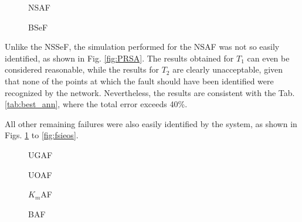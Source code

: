 \documentclass[10pt,fleqn,a4paper]{article}
\begin{document}
\begin{figure}[htb]
    \begin{minipage}[b]{0.48\linewidth}
        \scalebox{0.65}{}
        \vspace{0.5cm}
        \caption{NSAF}
        \label{fig:fasr}
    \end{minipage}
    \hfill
    \begin{minipage}[b]{0.48\linewidth}
        \scalebox{0.65}{}
        \vspace{0.5cm}
        \caption{BSeF}
        \label{fig:fseq}
    \end{minipage}
\end{figure}

Unlike the NSSeF, the simulation performed for the NSAF was not so easily
identified, as shown in Fig. \ref{fig:PRSA}. The results obtained for $T_1$ can
even be considered reasonable, while the results for $T_2$ are clearly
unacceptable, given that none of the points at which the fault should have been
identified were recognized by the network. Nevertheless, the results are
consistent with the Tab. \ref{tab:best_ann}, where the total error exceeds 40\%.

All other remaining failures were also easily identified by the system, as shown
in Figs. \ref{fig:fseq} to \ref{fig:fsieos}.

\begin{figure}[htb]
    \begin{minipage}[b]{0.48\linewidth}
        \scalebox{0.65}{}
        \vspace{0.5cm}
        \caption{UGAF}
        \label{fig:fadg}
    \end{minipage}
    \hfill
    \begin{minipage}[b]{0.48\linewidth}
        \scalebox{0.65}{}
        \vspace{0.5cm}
        \caption{UOAF}
        \label{fig:fado}
    \end{minipage}
\end{figure}

\begin{figure}[htb]
    \begin{minipage}[b]{0.48\linewidth}
        \scalebox{0.65}{}
        \vspace{0.5cm}
        \caption{$K_m$AF}
        \label{fig:favk}
    \end{minipage}
    \hfill
    \begin{minipage}[b]{0.48\linewidth}
        \scalebox{0.65}{}
        \vspace{0.5cm}
        \caption{BAF}
        \label{fig:faq}
    \end{minipage}
\end{figure}
\end{document}
